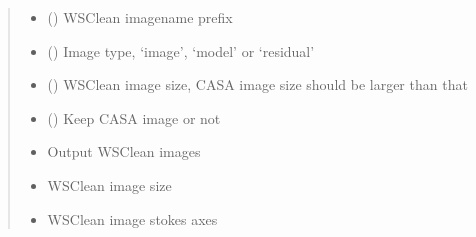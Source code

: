 \documentclass[letterpaper,10pt,english]{sphinxmanual}
\begin{document}
\begin{fulllineitems}
\begin{fulllineitems}
\begin{quote}
\begin{description}
\begin{itemize}
\item {} 
\sphinxAtStartPar
{} () \textendash{} WSClean imagename prefix

\item {} 
\sphinxAtStartPar
{} () \textendash{} Image type, ‘image’, ‘model’ or ‘residual’

\item {} 
\sphinxAtStartPar
{} () \textendash{} WSClean image size, CASA image size should be larger than that

\item {} 
\sphinxAtStartPar
{} () \textendash{} Keep CASA image or not

\end{itemize}

\item[{Returns}] \leavevmode
\sphinxAtStartPar
\begin{itemize}
\item {} 
\sphinxAtStartPar
{} \textendash{} Output WSClean images

\item {} 
\sphinxAtStartPar
{} \textendash{} WSClean image size

\item {} 
\sphinxAtStartPar
{} \textendash{} WSClean image stokes axes

\end{itemize}


\end{description}\end{quote}

\end{fulllineitems}



\end{fulllineitems}
\end{document}
